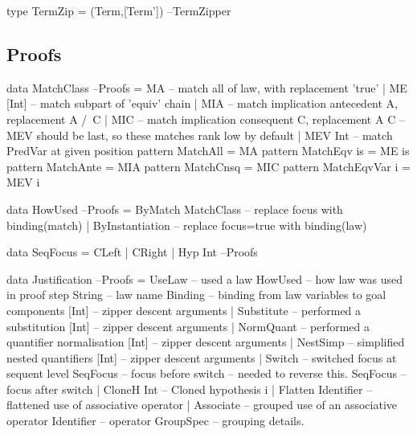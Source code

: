 \begin{code}
type TermZip = (Term,[Term'])                                    --TermZipper
\end{code}

\subsection{Proofs}

\begin{code}
data MatchClass                                                       --Proofs
  = MA       -- match all of law, with replacement 'true'
  | ME [Int] -- match subpart of 'equiv' chain
  | MIA      -- match implication antecedent A, replacement A /\ C
  | MIC      -- match implication consequent C, replacement A \/ C
  -- MEV should be last, so these matches rank low by default
  | MEV Int  -- match PredVar at given position
pattern MatchAll       = MA
pattern MatchEqv is    = ME is
pattern MatchAnte      = MIA
pattern MatchCnsq      = MIC
pattern MatchEqvVar i  = MEV i
\end{code}

\begin{code}
data HowUsed                                                          --Proofs
  = ByMatch MatchClass  -- replace focus with binding(match)
  | ByInstantiation     -- replace focus=true with binding(law)
\end{code}

\begin{code}
data SeqFocus = CLeft | CRight | Hyp Int                              --Proofs
\end{code}

\begin{code}
data Justification                                                    --Proofs
  = UseLaw             -- used a law
      HowUsed              -- how law was used in proof step
      String               -- law name
      Binding              -- binding from law variables to goal components
      [Int]                -- zipper descent arguments
  | Substitute         -- performed a substitution
      [Int]                -- zipper descent arguments
  | NormQuant          -- performed a quantifier normalisation
      [Int]                -- zipper descent arguments
  | NestSimp           -- simplified nested quantifiers
      [Int]                -- zipper descent arguments
  | Switch             -- switched focus at sequent level
      SeqFocus             -- focus before switch -- needed to reverse this.
      SeqFocus             -- focus after switch
  | CloneH Int         --  Cloned hypothesis i
  | Flatten Identifier -- flattened use of associative operator
  | Associate          -- grouped use of an associative operator
      Identifier           -- operator
      GroupSpec            -- grouping details.
\end{code}

